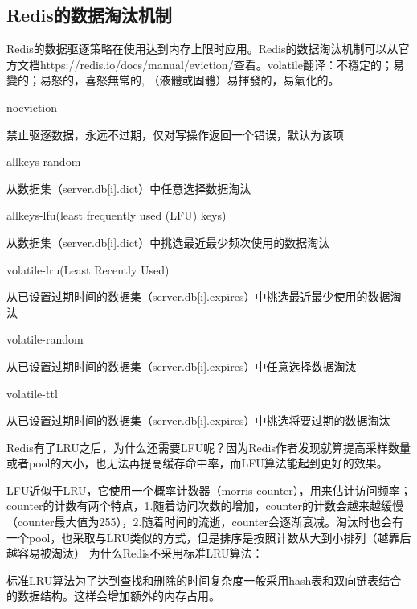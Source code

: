 \documentclass[../../../interview-questions.tex]{subfiles}
\begin{document}
\subsection{Redis的数据淘汰机制}

Redis的数据驱逐策略在使用达到内存上限时应用。Redis的数据淘汰机制可以从官方文档https://redis.io/docs/manual/eviction/查看。volatile翻译：不穩定的；易變的；易怒的，喜怒無常的, （液體或固體）易揮發的，易氣化的。

noeviction

禁止驱逐数据，永远不过期，仅对写操作返回一个错误，默认为该项

allkeys-random

从数据集（server.db[i].dict）中任意选择数据淘汰

allkeys-lfu(least frequently used (LFU) keys)

从数据集（server.db[i].dict）中挑选最近最少频次使用的数据淘汰

volatile-lru(Least Recently Used)

从已设置过期时间的数据集（server.db[i].expires）中挑选最近最少使用的数据淘汰

volatile-random

从已设置过期时间的数据集（server.db[i].expires）中任意选择数据淘汰

volatile-ttl

从已设置过期时间的数据集（server.db[i].expires）中挑选将要过期的数据淘汰


Redis有了LRU之后，为什么还需要LFU呢？因为Redis作者发现就算提高采样数量或者pool的大小，也无法再提高缓存命中率，而LFU算法能起到更好的效果。

LFU近似于LRU，它使用一个概率计数器（morris counter），用来估计访问频率；counter的计数有两个特点，1.随着访问次数的增加，counter的计数会越来越缓慢（counter最大值为255），2.随着时间的流逝，counter会逐渐衰减。淘汰时也会有一个pool，也采取与LRU类似的方式，但是排序是按照计数从大到小排列（越靠后越容易被淘汰）
为什么Redis不采用标准LRU算法：

标准LRU算法为了达到查找和删除的时间复杂度一般采用hash表和双向链表结合的数据结构。这样会增加额外的内存占用。
\end{document}
